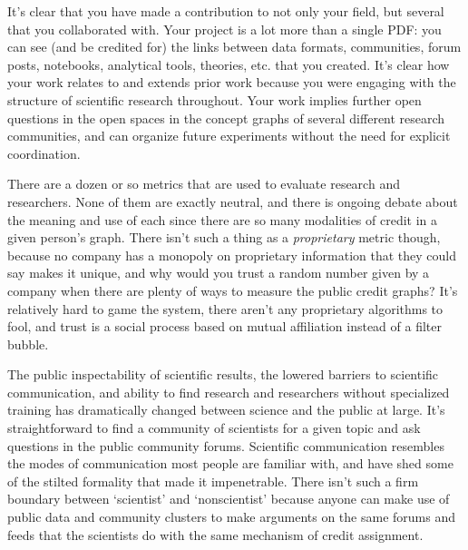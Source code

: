 It's clear that you have made a contribution to not only your field, but
several that you collaborated with. Your project is a lot more than a
single PDF: you can see (and be credited for) the links between data
formats, communities, forum posts, notebooks, analytical tools,
theories, etc. that you created. It's clear how your work relates to and
extends prior work because you were engaging with the structure of
scientific research throughout. Your work implies further open questions
in the open spaces in the concept graphs of several different research
communities, and can organize future experiments without the need for
explicit coordination.

There are a dozen or so metrics that are used to evaluate research and
researchers. None of them are exactly neutral, and there is ongoing
debate about the meaning and use of each since there are so many
modalities of credit in a given person's graph. There isn't such a thing
as a \emph{proprietary} metric though, because no company has a monopoly
on proprietary information that they could say makes it unique, and why
would you trust a random number given by a company when there are plenty
of ways to measure the public credit graphs? It's relatively hard to
game the system, there aren't any proprietary algorithms to fool, and
trust is a social process based on mutual affiliation instead of a
filter bubble.

The public inspectability of scientific results, the lowered barriers to
scientific communication, and ability to find research and researchers
without specialized training has dramatically changed between science
and the public at large. It's straightforward to find a community of
scientists for a given topic and ask questions in the public community
forums. Scientific communication resembles the modes of communication
most people are familiar with, and have shed some of the stilted
formality that made it impenetrable. There isn't such a firm boundary
between `scientist' and `nonscientist' because anyone can make use of
public data and community clusters to make arguments on the same forums
and feeds that the scientists do with the same mechanism of credit
assignment.

